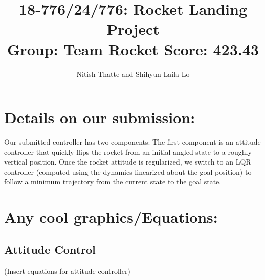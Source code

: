 \documentclass{article}
\title{18-776/24/776: Rocket Landing Project \\ Group: Team Rocket \quad Score: 423.43}
\author{Nitish Thatte and Shihyun Laila Lo}
\begin{document}
\maketitle

\section{Details on our submission:}
Our submitted controller has two components: The first component is an attitude
controller that quickly flips the rocket from an initial angled state to a
roughly vertical position. Once the rocket attitude is regularized, we switch
to an LQR controller (computed using the dynamics linearized about the goal
position) to follow a minimum trajectory from the current state to the goal
state.

\section{Any cool graphics/Equations:}
\subsection{Attitude Control}
(Insert equations for attitude controller)
\end{document}
